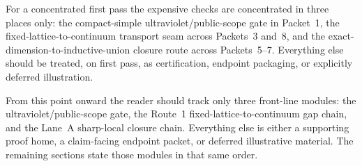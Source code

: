 For a concentrated first pass the expensive checks are concentrated in three places only: the compact-simple ultraviolet/public-scope gate in Packet~1, the fixed-lattice-to-continuum transport seam across Packets~3 and~8, and the exact-dimension-to-inductive-union closure route across Packets~5--7. Everything else should be treated, on first pass, as certification, endpoint packaging, or explicitly deferred illustration.

From this point onward the reader should track only three front-line modules: the ultraviolet/public-scope gate, the Route~1 fixed-lattice-to-continuum gap chain, and the Lane~A sharp-local closure chain. Everything else is either a supporting proof home, a claim-facing endpoint packet, or deferred illustrative material. The remaining sections state those modules in that same order.
